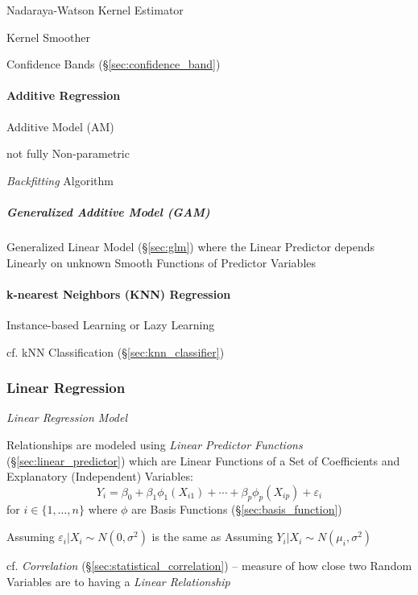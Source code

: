 Nadaraya-Watson Kernel Estimator

Kernel Smoother

Confidence Bands (\S\ref{sec:confidence_band})



\paragraph{Additive Regression}\label{sec:additive_regression}\hfill

Additive Model (AM)

not fully Non-parametric

\emph{Backfitting} Algorithm



\subparagraph{Generalized Additive Model (GAM)}\label{sec:gam}\hfill

Generalized Linear Model (\S\ref{sec:glm}) where the Linear Predictor depends
Linearly on unknown Smooth Functions of Predictor Variables



\paragraph{k-nearest Neighbors (KNN) Regression}\label{sec:knn_regression}

Instance-based Learning or Lazy Learning

cf. kNN Classification (\S\ref{sec:knn_classifier})



\subsubsection{Linear Regression}\label{sec:linear_regression}

\emph{Linear Regression Model}

Relationships are modeled using \emph{Linear Predictor Functions}
(\S\ref{sec:linear_predictor}) which are Linear Functions of a Set of
Coefficients and Explanatory (Independent) Variables:
\[
  Y_i = \beta_0 + \beta_1\phi_1(X_{i1}) + \cdots +
    \beta_p\phi_p(X_{ip}) + \varepsilon_i
\]
for $i \in \{1, \ldots, n\}$ where $\phi$ are Basis Functions
(\S\ref{sec:basis_function})

Assuming $\varepsilon_i | X_i \sim N(0, \sigma^2)$ is the same as Assuming
$Y_i | X_i \sim N(\mu_i, \sigma^2)$

cf. \emph{Correlation} (\S\ref{sec:statistical_correlation}) -- measure of how
close two Random Variables are to having a \emph{Linear Relationship}

